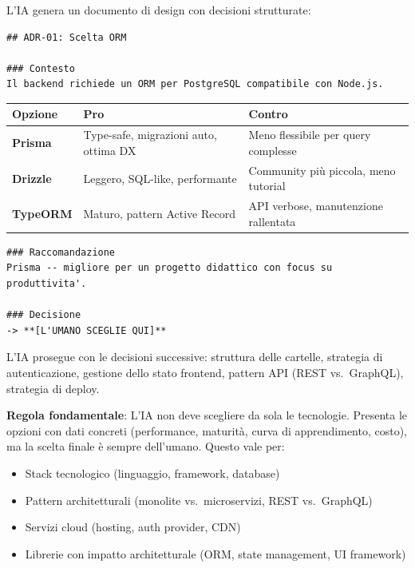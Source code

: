 L'IA genera un documento di design con decisioni strutturate:

\begin{lstlisting}[language={}]
## ADR-01: Scelta ORM

### Contesto
Il backend richiede un ORM per PostgreSQL compatibile con Node.js.
\end{lstlisting}

\begin{center}
\begin{tabularx}{\textwidth}{l X X}
\toprule
\textbf{Opzione} & \textbf{Pro} & \textbf{Contro} \\
\midrule
\textbf{Prisma} & Type-safe, migrazioni auto, ottima DX & Meno flessibile per query complesse \\
\textbf{Drizzle} & Leggero, SQL-like, performante & Community più piccola, meno tutorial \\
\textbf{TypeORM} & Maturo, pattern Active Record & API verbose, manutenzione rallentata \\
\bottomrule
\end{tabularx}
\end{center}

\begin{lstlisting}[language={}]
### Raccomandazione
Prisma -- migliore per un progetto didattico con focus su produttivita'.

### Decisione
-> **[L'UMANO SCEGLIE QUI]**
\end{lstlisting}

L'IA prosegue con le decisioni successive: struttura delle cartelle, strategia di autenticazione, gestione dello stato frontend, pattern API (REST vs.\ GraphQL), strategia di deploy.

\begin{warnbox}
\textbf{Regola fondamentale}: L'IA non deve scegliere da sola le tecnologie. Presenta le opzioni con dati concreti (performance, maturità, curva di apprendimento, costo), ma la scelta finale è sempre dell'umano. Questo vale per:
\begin{itemize}
  \item Stack tecnologico (linguaggio, framework, database)
  \item Pattern architetturali (monolite vs.\ microservizi, REST vs.\ GraphQL)
  \item Servizi cloud (hosting, auth provider, CDN)
  \item Librerie con impatto architetturale (ORM, state management, UI framework)
\end{itemize}
\end{warnbox}

